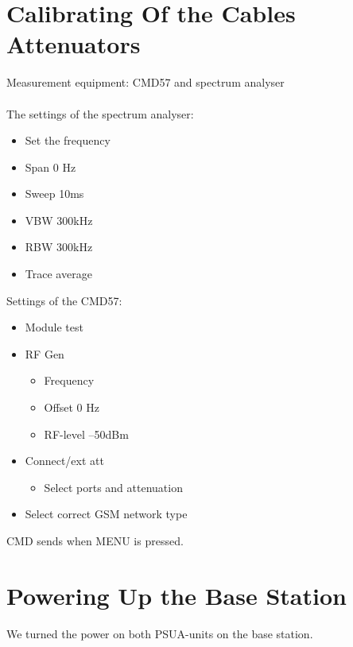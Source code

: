 \documentclass[english]{article}
\begin{document}
\section{Calibrating Of the Cables Attenuators}
Measurement equipment: CMD57 and spectrum analyser\\\\
The settings of the spectrum analyser:
\begin{itemize}
\item Set the frequency
\item Span 0 Hz
\item Sweep 10ms
\item VBW 300kHz
\item RBW 300kHz
\item Trace average
\end{itemize}
Settings of the CMD57:
\begin{itemize}
\item Module test
\item RF Gen
\begin{itemize}
\item Frequency
\item Offset 0 Hz
\item RF-level –50dBm
\end{itemize}
\item Connect/ext att
\begin{itemize}
\item Select ports and attenuation
\end{itemize}
\item Select correct GSM network type
\end{itemize}
CMD sends when MENU is pressed.
\section{Powering Up the Base Station}
We turned the power on both PSUA-units on the base station.
\end{document}
